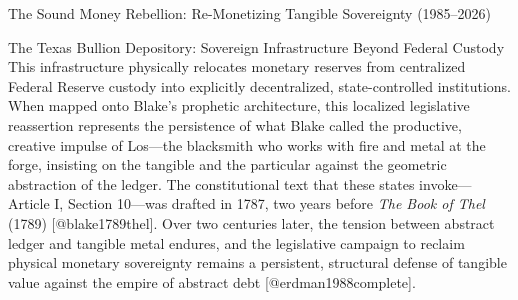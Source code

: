 \documentclass[
  ignorenonframetext,
]{beamer}
\begin{document}
\begin{frame}{The Sound Money Rebellion: Re-Monetizing Tangible
Sovereignty (1985--2026)}
\begin{block}{The Texas Bullion Depository: Sovereign Infrastructure
Beyond Federal Custody}
This infrastructure physically relocates monetary reserves from
centralized Federal Reserve custody into explicitly decentralized,
state-controlled institutions. When mapped onto Blake's prophetic
architecture, this localized legislative reassertion represents the
persistence of what Blake called the productive, creative impulse of
Los---the blacksmith who works with fire and metal at the forge,
insisting on the tangible and the particular against the geometric
abstraction of the ledger. The constitutional text that these states
invoke---Article I, Section 10---was drafted in 1787, two years before
\emph{The Book of Thel} (1789) {[}@blake1789thel{]}. Over two centuries
later, the tension between abstract ledger and tangible metal endures,
and the legislative campaign to reclaim physical monetary sovereignty
remains a persistent, structural defense of tangible value against the
empire of abstract debt {[}@erdman1988complete{]}.
\end{block}
\end{frame}
\end{document}
